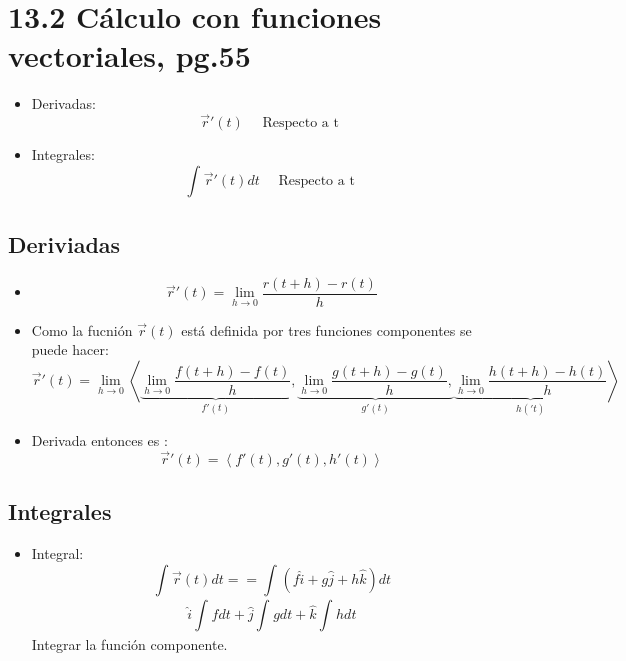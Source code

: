 \section{13.2 Cálculo con funciones vectoriales, pg.55}
\begin{itemize}
    \item Derivadas:
        \[
          \vec{r}'(t) \quad \text{  Respecto a t  }
        \]
    
    \item Integrales:
        \[
          \int_{}^{}\vec{r}'(t)dt \quad \text{  Respecto a t  }
        \]
\end{itemize}


\subsection{Deriviadas}
\begin{itemize}
    \item \[
      \vec{r}'(t) = \lim_{h \to 0} \frac{r(t+h)-r(t)}{h} 
    \]
    
    \item Como la fucnión $\vec{r}(t)$ está definida por tres funciones componentes se puede hacer: 
        \[
          \vec{r}'(t) = \lim_{h \to 0} \left\langle 
          \underbrace{\lim_{h \to 0} \frac{f(t+h)-f(t)}{h}}_{f'(t)}, 
          \underbrace{\lim_{h \to 0} \frac{g(t+h)-g(t)}{h}, }_{g'(t)}
          \underbrace{\lim_{h \to 0} \frac{h(t+h)-h(t)}{h}  }_{h('t)}
          \right\rangle 
        \]
    
    \item Derivada entonces es : 
        \[
          \vec{r}'(t) = \left\langle f'(t),g'(t),h'(t) \right\rangle 
        \]
\end{itemize}


\subsection{Integrales}
\begin{itemize}
    \item Integral:
        \[
          \int_{}^{}\vec{r}(t)dt = = \int_{}^{}(f \hat{i} + g \hat{j} + h \hat{k} )dt
        \]
        \[
          \hat{i} \int_{}^{}fdt + \hat{j} \int_{}^{}gdt + \hat{k} \int_{}^{}hdt 
        \]
        Integrar la función componente.
\end{itemize}


